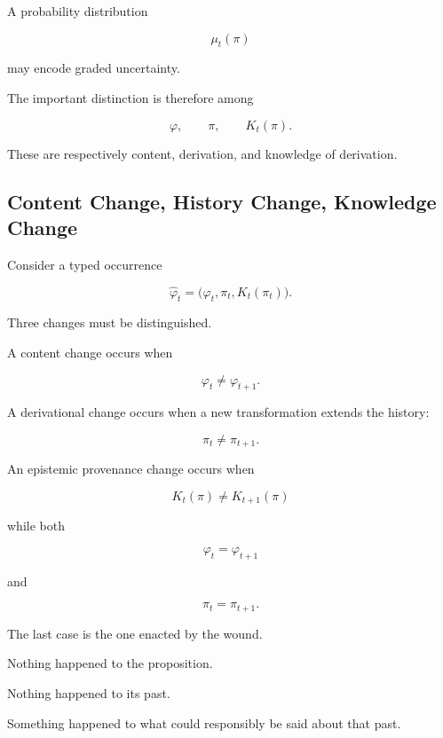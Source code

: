 \documentclass[
  11pt,
  a4paper,
  DIV=12,
  BCOR=0mm,
  parskip=half-
]{scrartcl}
\theoremstyle{definition}
\theoremstyle{plain}
\theoremstyle{remark}
\begin{document}
A probability distribution

\[
  \mu_t(\pi)
\]

may encode graded uncertainty.

The important distinction is therefore among

\[
  \varphi,
  \qquad
  \pi,
  \qquad
  K_t(\pi).
\]

These are respectively content, derivation, and knowledge of derivation.


\subsection{Content Change, History Change, Knowledge Change}
\label{app:three-changes}

Consider a typed occurrence

\[
  \widehat\varphi_t
  =
  \bigl(
    \varphi_t,
    \pi_t,
    K_t(\pi_t)
  \bigr).
\]

Three changes must be distinguished.

A content change occurs when

\[
  \varphi_t\neq\varphi_{t+1}.
\]

A derivational change occurs when a new transformation extends the history:

\[
  \pi_t\neq\pi_{t+1}.
\]

An epistemic provenance change occurs when

\[
  K_t(\pi)\neq K_{t+1}(\pi)
\]

while both

\[
  \varphi_t=\varphi_{t+1}
\]

and

\[
  \pi_t=\pi_{t+1}.
\]

The last case is the one enacted by the wound.

Nothing happened to the proposition.

Nothing happened to its past.

Something happened to what could responsibly be said about that past.

\end{document}
